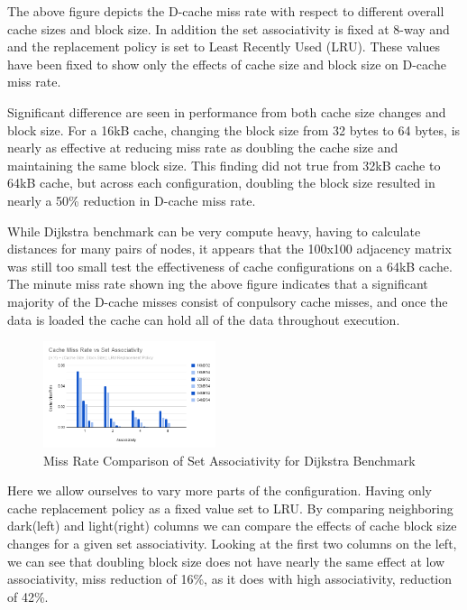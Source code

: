 \documentclass[conference]{IEEEtran}
\begin{document}
The above figure depicts the D-cache miss rate with respect to different overall cache sizes and block size. In addition the set associativity is fixed at 8-way and and the replacement policy is set to Least Recently Used (LRU). These values have been fixed to show only the effects of cache size and block size on D-cache miss rate. 

Significant difference are seen in performance from both cache size changes and block size. For a 16kB cache, changing the block size from 32 bytes to 64 bytes, is nearly as effective at reducing miss rate as doubling the cache size and maintaining the same block size. This finding did not true from 32kB cache to 64kB cache, but across each configuration, doubling the block size resulted in nearly a 50\% reduction in D-cache miss rate.

While Dijkstra benchmark can be very compute heavy, having to calculate distances for many pairs of nodes, it appears that the 100x100 adjacency matrix was still too small test the effectiveness of cache configurations on a 64kB cache. The minute miss rate shown ing the above figure indicates that a significant majority of the D-cache misses consist of conpulsory cache misses, and once the data is loaded the cache can hold all of the data throughout execution.

\begin{figure}[H]
  \centering
  \includegraphics[width=0.45\textwidth]{dijkstraFigures/CacheMissRatevsSetAssociativity.png}
  \caption{Miss Rate Comparison of Set Associativity for Dijkstra Benchmark}
  \label{fig:MissRateVsAssoc}
\end{figure}

Here we allow ourselves to vary more parts of the configuration. Having only cache replacement policy as a fixed value set to LRU. By comparing neighboring dark(left) and light(right) columns we can compare the effects of cache block size changes for a given set associativity. Looking at the first two columns on the left, we can see that doubling block size does not have nearly the same effect at low associativity, miss reduction of 16\%, as it does with high associativity, reduction of 42\%.
\end{document}

